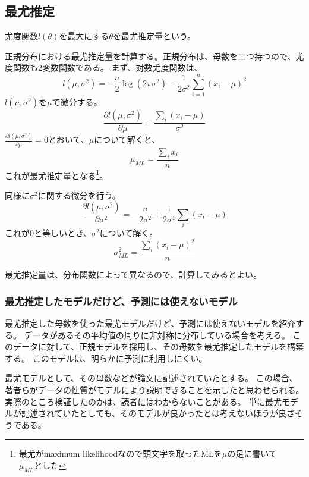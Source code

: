 \subsection{最尤推定}
\begin{defi}
    尤度関数$l(\theta)$を最大にする$\theta$を最尤推定量という。
\end{defi}
正規分布における最尤推定量を計算する。正規分布は、母数を二つ持つので、尤度関数も2変数関数である。
まず、対数尤度関数は、
\begin{equation*}
    l(\mu,\sigma^2) = -\frac{n}{2}\log(2\pi\sigma^2)-\frac{1}{2\sigma^2}\sum_{i=1}^n(x_i-\mu)^2 
\end{equation*}
$l(\mu,\sigma^2)$を$\mu$で微分する。
\begin{equation*}
    \frac{\partial l(\mu,\sigma^2)}{\partial \mu} = \frac{\sum_i(x_i-\mu)}{\sigma^2}
\end{equation*}
$\frac{\partial l(\mu,\sigma^2)}{\partial \mu} = 0$とおいて、$\mu$について解くと、
\begin{equation*}
    \mu_{ML} = \frac{\sum_i x_i}{n}
\end{equation*}
これが最尤推定量となる\footnote{最尤がmaximum likelihoodなので頭文字を取ったMLを$\mu$の足に書いて$\mu_{ML}とした$}。

同様に$\sigma^2$に関する微分を行う。
\begin{equation*}
    \frac{\partial l(\mu,\sigma^2)}{\partial \sigma^2} = -\frac{n}{2\sigma^2}+\frac{1}{2\sigma^4}\sum_i(x_i-\mu)
\end{equation*}
これが$0$と等しいとき、$\sigma^2$について解く。
\begin{equation*}
    \sigma^2_{ML} = \frac{\sum_i(x_i-\mu)^2}{n}
\end{equation*}

最尤推定量は、分布関数によって異なるので、計算してみるとよい。

\subsubsection{最尤推定したモデルだけど、予測には使えないモデル}\label{likelihood_model_unpredictable}
最尤推定した母数を使った最尤モデルだけど、予測には使えないモデルを紹介する。
データがあるその平均値の周りに非対称に分布している場合を考える。
このデータに対して、正規モデルを採用し、その母数を最尤推定したモデルを構築する。
このモデルは、明らかに予測に利用しにくい。

最尤モデルとして、その母数などが論文に記述されていたとする。
この場合、著者らがデータの性質がモデルにより説明できることを示したと思わせられる。
実際のところ検証したのかは、読者にはわからないことがある。
単に最尤モデルが記述されていたとしても、そのモデルが良かったとは考えないほうが良さそうである。

